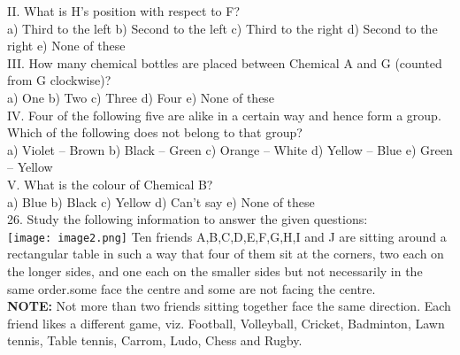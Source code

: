 \documentclass[
]{article}
\begin{document}
II. What is H’s position with respect to F?\\
a) Third to the left \hspace{2mm}b) Second to the left \hspace{2mm}c) Third to the right
\hspace{2mm}d) Second to the right \hspace{2mm}e) None of these\\

III. How many chemical bottles are placed between Chemical A and G (counted from G
clockwise)?\\
a) One \hspace{2mm}b) Two \hspace{2mm}c) Three \hspace{2mm}d) Four \hspace{2mm}e) None of these\\

IV. Four of the following five are alike in a certain way and hence form a group. Which of
the following does not belong to that group?\\
a) Violet – Brown \hspace{2mm}b) Black – Green \hspace{2mm}c) Orange – White \hspace{2mm}d) Yellow – Blue \hspace{2mm}e) Green – Yellow\\

V. What is the colour of Chemical B?\\
a) Blue \hspace{2mm}b) Black \hspace{2mm}c) Yellow \hspace{2mm}d) Can’t say \hspace{2mm}e) None of these\\

26. Study the following information to answer the given questions:\\
\texttt{[image: image2.png]}
Ten friends A,B,C,D,E,F,G,H,I and J are sitting around a rectangular table in such a way that
four of them sit at the corners, two each on the longer sides, and one each on the smaller
sides but not necessarily in the same order.some face the centre and some are not facing the
centre.\\

\textbf{NOTE:} Not more than two friends sitting together face the same direction.
Each friend likes a different game, viz. Football, Volleyball, Cricket, Badminton, Lawn
tennis, Table tennis, Carrom, Ludo, Chess and Rugby.\\
\end{document}
